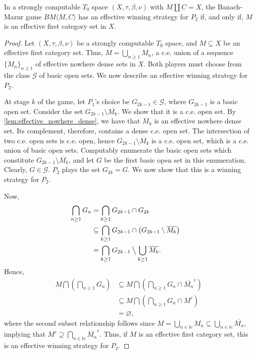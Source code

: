 \documentclass[a4paper,UKenglish,autoref,thm-restate,numberwithinsect]{lipics-v2021}
\newcommand{\N}{\mathbb{N}}
\begin{document}
\begin{theorem}\label{thm:effbm1}
	In a strongly computable $T_0$ space $(X,\tau,\beta,\nu)$ with $M\coprod C=X$, the Banach-Mazur game $BM\langle M,C\rangle$ has an effective winning strategy for $P_2$ if, and only if, $M$ is an effective first category set in $X$. 
\end{theorem}
\begin{proof}
	Let $(X,\tau,\beta,\nu)$ be a strongly computable $T_0$ space, and $M\subseteq X$ be an effective first category set. Thus,	$M=\bigcup_{n\geq1}M_n$, a c.e. union of a sequence $\{M_n\}_{n\geq1}$ of effective nowhere dense sets in $X$. Both players must choose from the class $\mathcal{G}$ of basic open sets.	We now describe an effective winning strategy for $P_2$. 
	
	At stage $k$ of the game, let $P_1$'s choice be $G_{2k-1}\in\mathcal{G}$, where $G_{2k-1}$ is a basic open set. Consider the set $G_{2k-1}\setminus\overline{M_k}$. We show that it is a c.e. open set. By \cref{lem:effective_nowhere_dense}, we have	that $\overline{M_k}$ is an effective nowhere dense set. Its complement, therefore, contains a dense c.e. open set. The intersection of two c.e. open sets is c.e. open, hence $G_{2k-1}\setminus\overline{M_k}$ is a c.e. open set, which is a c.e. union of basic open sets. Computably enumerate the basic open sets which constitute $G_{2k-1} \setminus\overline{M_k}$, and let $G$ be the first basic open set in this enumeration. Clearly, $G \in \mathcal{G}$. $P_2$ plays the set $G_{2k}=G$. We now show that this is a winning strategy for $P_2$. 
	
	Now,
	\begin{align*}
		\bigcap_{n\geq1}G_n &=\bigcap_{k\ge1}G_{2k-1}\cap G_{2k}\\
		&\subseteq \bigcap_{k\ge1}G_{2k-1}\cap\left(G_{2k-1}\setminus \overline{M_k}\right)&\\
		&=\bigcap_{k\ge1} G_{2k-1}\mathbin{\big\backslash} \bigcup_{k\geq1}
		\overline{M_k}.
	\end{align*}
	Hence,
	\begin{align*}
		M\bigcap\left(\bigcap_{n\geq 1}G_n\right)
		&\subseteq M\bigcap \left(\bigcap_{n \ge 1} G_n \cap \overline{M_n}^c\right)\\
		&\subseteq M\bigcap \left(\bigcap_{n \ge 1} G_n
		\cap M^c\right)\\
		&=\varnothing,
	\end{align*}
	where the second subset relationship follows since $M=\bigcup_{n\in\N}M_n \subseteq \bigcup_{n\in\N} \overline{M_n}$,	implying that $M^c \supseteq \bigcap_{n\in\N} \overline{M_n}^c$. Thus, if $M$ is an effective first category set, this is an effective winning strategy for $P_2$. 
	

\end{proof}
\end{document}
